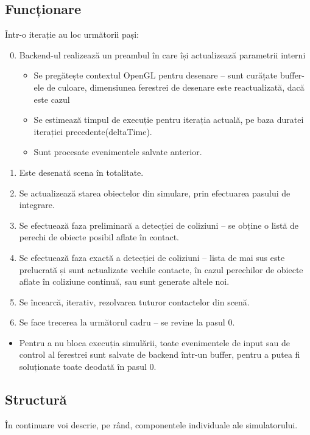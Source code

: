 \documentclass[12pt,a4paper]{report}
\begin{document}
\subsection{Funcționare}
Într-o iterație au loc următorii pași:
\begin{enumerate}
	\setcounter{enumi}{-1}
	\item Backend-ul realizează un preambul în care își actualizează parametrii interni
	\begin{itemize}
		\item Se pregătește contextul OpenGL pentru desenare -- sunt curățate buffer-ele de culoare, dimensiunea ferestrei de desenare este reactualizată, dacă este cazul
		\item Se estimează timpul de execuție pentru iterația actuală, pe baza duratei iterației precedente(deltaTime).
		\item Sunt procesate evenimentele salvate anterior.
	\end{itemize}
	\item Este desenată scena în totalitate.
	\item Se actualizează starea obiectelor din simulare, prin efectuarea pasului de integrare.
	\item Se efectuează faza preliminară a detecției de coliziuni -- se obține o listă de perechi de obiecte posibil aflate în contact.
	\item Se efectuează faza exactă a detecției de coliziuni -- lista de mai sus este prelucrată și sunt actualizate vechile contacte, în cazul perechilor de obiecte aflate în coliziune continuă, sau sunt generate altele noi.
	\item Se încearcă, iterativ, rezolvarea tuturor contactelor din scenă.
	\item Se face trecerea la următorul cadru -- se revine la pasul 0.
\end{enumerate}
\begin{itemize}
	\item Pentru a nu bloca execuția simulării, toate evenimentele de input sau de control al ferestrei sunt salvate de backend într-un buffer, pentru a putea fi soluționate toate deodată în pasul 0.
\end{itemize}

\subsection{Structură}
În continuare voi descrie, pe rând, componentele individuale ale simulatorului.
\end{document}
